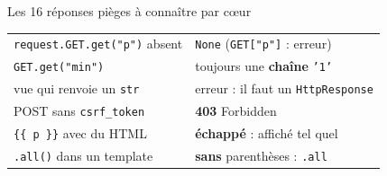 \documentclass[a4paper,10pt]{article}
\newcommand{\co}[1]{\texttt{\textcolor{codefg}{#1}}}
\begin{document}
\begin{piegebox}{Les 16 réponses pièges à connaître par c\oe ur}
\begin{minipage}[t]{0.485\linewidth}
\begin{tabularx}{\linewidth}{@{}l>{\raggedright\arraybackslash}X@{}}
\co{request.GET.get("p")} absent & \co{None} (\co{GET["p"]} : erreur) \\
\co{GET.get("min")}       & toujours une \textbf{chaîne} \co{'1'} \\
vue qui renvoie un \co{str} & erreur : il faut un \co{HttpResponse} \\
POST sans \co{csrf\_token} & \textbf{403} Forbidden \\
\co{\{\{ p \}\}} avec du HTML & \textbf{échappé} : affiché tel quel \\
\co{.all()} dans un template & \textbf{sans} parenthèses : \co{.all} \\
\bottomrule
\end{tabularx}
\end{minipage}
\end{piegebox}
\end{document}
